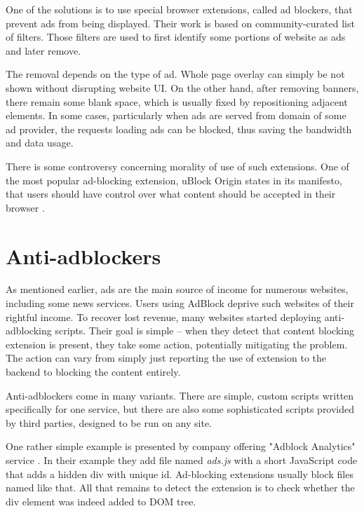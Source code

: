 One of the solutions is to use special browser extensions, called ad blockers, that prevent ads from being displayed.
Their work is based on community-curated list of filters. Those filters are used to first identify some portions
of website as ads and later remove.

The removal depends on the type of ad. Whole page overlay can simply be not shown without disrupting
website UI. On the other hand, after removing banners, there remain some blank space, which is usually
fixed by repositioning adjacent elements. In some cases, particularly when ads are served from domain
of some ad provider, the requests loading ads can be blocked, thus saving the bandwidth and data usage.

There is some controversy concerning morality of use of such extensions.
One of the most popular ad-blocking extension, uBlock Origin states in its manifesto,
that users should have control over what content should be accepted in their browser \cite{ublock:manifesto}.



\section{Anti-adblockers}
As mentioned earlier, ads are the main source of income for numerous websites, including some 
news services. Users using AdBlock deprive such websites of their rightful income.
To recover lost revenue, many websites started deploying anti-adblocking scripts.
Their goal is simple -- when they detect that content blocking extension is present, 
they take some action, potentially mitigating the problem.
The action can vary from simply just reporting the use of extension to the backend to blocking 
the content entirely.

Anti-adblockers come in many variants. There are simple, custom scripts written 
specifically for one service, but there are also some sophisticated scripts 
provided by third parties, designed to be run on any site.

One rather simple example is presented by company offering "Adblock Analytics" service \cite{detect-adblock}.
In their example they add file named \emph{ads.js} with a short JavaScript code that adds a hidden div with unique id.
Ad-blocking extensions usually block files named like that. All that remains to detect the extension is to
check whether the div element was indeed added to DOM tree.


